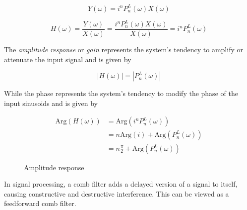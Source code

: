 \documentclass[11pt]{article}
\theoremstyle{plain}
\theoremstyle{definition}
\theoremstyle{remark}
\begin{document}
\begin{equation*}
	Y(\omega) = i^n P_n^L(\omega) X(\omega)
\end{equation*}

\begin{equation*}
	H(\omega) = \frac{Y(\omega)}{X(\omega)} = \frac{i^n P_n^L(\omega) X(\omega)}{X(\omega)} = i^n P_n^L(\omega)
\end{equation*}

The \emph{amplitude response} or \emph{gain} represents the system's tendency to amplify or attenuate the input signal and is given by

\begin{equation*}
	|H(\omega)| = |P_n^L(\omega)|
\end{equation*}

While the phase represents the system's tendency to modify the phase of the input sinusoids and is given by

\begin{align*}
	\mathrm{Arg}(H(\omega)) &= \mathrm{Arg}(i^n P_n^L(\omega)) \\
													&= n \mathrm{Arg}(i) + \mathrm{Arg}(P_n^L(\omega)) \\
													&= n \frac{\pi}{2} + \mathrm{Arg}(P_n^L(\omega)) 
\end{align*}

\begin{figure}[H] %
\caption{Amplitude response}
\label{fig:amp_response}
\end{figure}

In signal processing, a comb filter adds a delayed version of a signal to itself, causing constructive and destructive interference.
This can be viewed as a feedforward comb filter.


\end{document}
